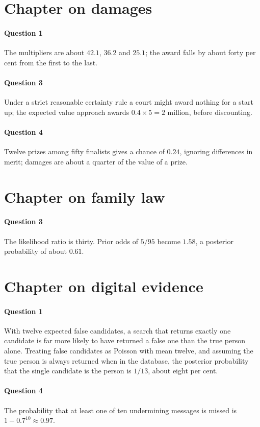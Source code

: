 \section*{Chapter on damages}
\paragraph{Question 1} The multipliers are about $42.1$, $36.2$ and $25.1$; the award falls by about forty per cent from the first to the last.
\paragraph{Question 3} Under a strict reasonable certainty rule a court might award nothing for a start up; the expected value approach awards $0.4\times 5 = 2$ million, before discounting.
\paragraph{Question 4} Twelve prizes among fifty finalists gives a chance of $0.24$, ignoring differences in merit; damages are about a quarter of the value of a prize.

\section*{Chapter on family law}
\paragraph{Question 3} The likelihood ratio is thirty. Prior odds of $5/95$ become $1.58$, a posterior probability of about $0.61$.

\section*{Chapter on digital evidence}
\paragraph{Question 1} With twelve expected false candidates, a search that returns exactly one candidate is far more likely to have returned a false one than the true person alone. Treating false candidates as Poisson with mean twelve, and assuming the true person is always returned when in the database, the posterior probability that the single candidate is the person is $1/13$, about eight per cent.
\paragraph{Question 4} The probability that at least one of ten undermining messages is missed is $1 - 0.7^{10}\approx 0.97$.

